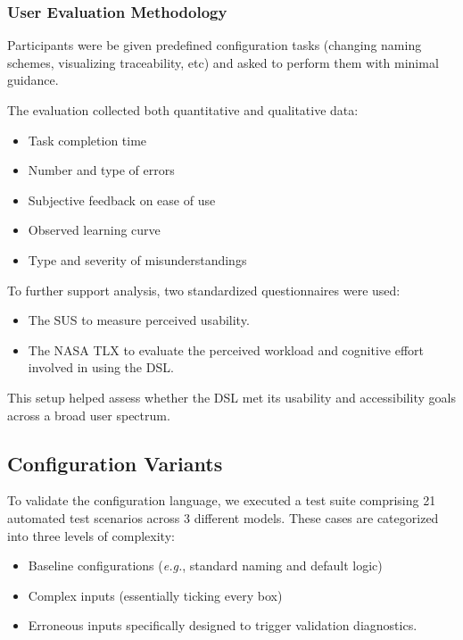 \subsubsection{User Evaluation Methodology}

Participants were be given predefined configuration tasks (changing naming schemes, visualizing traceability, etc) and asked to perform them with minimal guidance.

The evaluation collected both quantitative and qualitative data:
\begin{itemize}
	\item Task completion time
	\item Number and type of errors
	\item Subjective feedback on ease of use
	\item Observed learning curve
	\item Type and severity of misunderstandings
\end{itemize}

To further support analysis, two standardized questionnaires were used:

\begin{itemize}
	\item The \gls{SUS} to measure perceived usability.
	\item The NASA \gls{TLX} to evaluate the perceived workload and cognitive effort involved in using the DSL.
\end{itemize}

This setup helped assess whether the \gls{DSL} met its usability and accessibility goals across a broad user spectrum.

\subsection{Configuration Variants}

To validate the configuration language, we executed a test suite comprising 21 automated test scenarios across 3 different models. These cases are categorized into three levels of complexity:

\begin{itemize}
	\item Baseline configurations (\textit{e.g.}, standard naming and default logic)
	\item Complex inputs (essentially ticking every box)
	\item Erroneous inputs specifically designed to trigger validation diagnostics.
\end{itemize}

